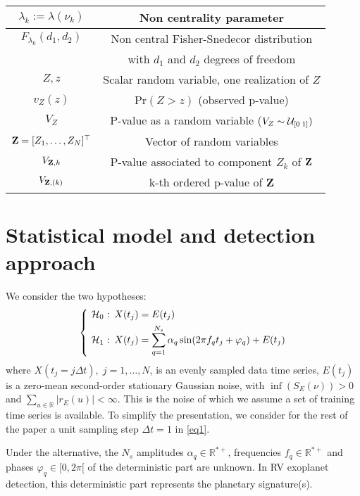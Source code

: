 \documentclass[journal]{IEEEtran}
\begin{document}
{\begin{table}[ht!]
\begin{tabular}{|c|c|}
\hline
	$ \lambda_k := \lambda(\nu_k)$ & Non centrality parameter \\[0.1cm] 
\hline
	$ F_{\lambda_k}(d_1,d_2) $ & Non central Fisher-Snedecor distribution \\
	& with $d_1$ and $d_2$ degrees of freedom \\[0.1cm] 
\hline
	$Z,z $ & Scalar random variable, one realization of $Z$ \\[0.1cm] 
\hline
	$ v_Z(z) $ & Pr$(Z>z)$ (observed p-value)  \\[0.1cm] 
\hline
	$ V_{Z} $ & P-value as a random variable ($ V_{Z}\sim {{\cal{U}}_{[0\; 1]}}) $ \\
\hline
	${\bf{Z}}=[Z_1,\hdots,Z_N]^\top $ & Vector of random variables \\[0.1cm] 
\hline
	$ V_{{\bf{Z}},k} $ & P-value associated to component $Z_k$ of  ${\bf{Z}}$\\[0.1cm] 
\hline
	$ V_{{\bf{Z}},(k)} $ & k-th ordered p-value of  {\bf{Z}} \\[0.1cm] 
\hline
\end{tabular}
\label{default}
\end{table}}
  
 
\section{Statistical model and detection approach}
 \label{sec2}
We consider the two hypotheses: 
\begin{equation} 
  \left\{         
      \begin{aligned}
	 \text{ ${\cal{H}}_0$ : } {X}(t_j) &= {\displaystyle{{{E}}}}(t_j) \\
	 \text{ ${\cal{H}}_1$ : } X(t_j) &=  \sum_{q = 1}^{N_s} \alpha_q \sin(2\pi f_q t_j+\varphi_q)+ E(t_j) \\
      \end{aligned}
    \right.
    \label{hyp}
\end{equation}
where $X(t_j=j\Delta t),\; j=1,\hdots,N$, is an evenly sampled data time series, $E(t_j)$ is a zero-mean second-order stationary Gaussian noise, 
{ with $\inf (S_E(\nu) ) > 0$ and ${ \sum_{u \in \mathbb{R}}} | r_E(u) | < \infty$}.   This is the noise of which we assume a set of training time series is available. { To simplify the presentation, we consider for the rest of the paper a unit  sampling step $\Delta t=1$ in \eqref{eq1}.}

 Under the alternative, the $N_s$  amplitudes $\alpha_q\in \mathbb{R}^{*+}$, frequencies  $f_q\in \mathbb{R}^{*+}$ and phases $\varphi_q \in [0,2\pi[$ of the deterministic part are unknown.  In RV exoplanet detection, this deterministic part represents the planetary signature(s). 
 
\end{document}
